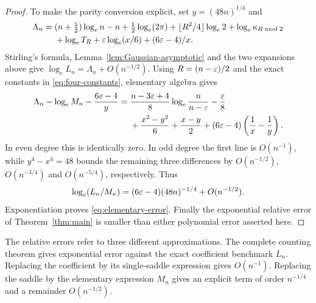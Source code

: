 \begin{proof}
To make the parity conversion explicit, set $y=(48n)^{1/4}$ and
\begin{align*}
 \Lambda_n={}&(n+\tfrac12)\log_en-n+\tfrac12\log_e(2\pi)
   +\lfloor R^2/4\rfloor\log_e2+\log_e\kappa_{R\bmod2}\\
 &+\log_eT_R+\varepsilon\log_e(x/6)+(6\varepsilon-4)/x.
\end{align*}
Stirling's formula, Lemma~\ref{lem:Gaussian-asymptotic} and the two
expansions above give $\log_e L_n=\Lambda_n+O(n^{-1/2})$.
Using $R=(n-\varepsilon)/2$ and the exact constants in
\eqref{eq:four-constants}, elementary algebra gives
\begin{align*}
 \Lambda_n-\log_eM_n-\frac{6\varepsilon-4}{y}
 ={}&\frac{n-3\varepsilon+4}{8}\log_e\frac{n}{n-\varepsilon}-\frac{\varepsilon}8\\
 &+\frac{x^2-y^2}{6}+\frac{x-y}{2}
       +(6\varepsilon-4)\left(\frac1x-\frac1y\right).
\end{align*}
In even degree this is identically zero. In odd degree the first line
is $O(n^{-1})$, while $y^4-x^4=48$ bounds the remaining three
differences by $O(n^{-1/2})$, $O(n^{-3/4})$ and $O(n^{-5/4})$,
respectively. Thus
\[
 \log_e(L_n/M_n)=(6\varepsilon-4)(48n)^{-1/4}+O(n^{-1/2}).
\]
Exponentiation proves \eqref{eq:elementary-error}. Finally the
exponential relative error of Theorem~\ref{thm:main}
is smaller than either polynomial error asserted here.
\end{proof}

\begin{remark}
The relative errors refer to three different approximations. The
complete counting theorem gives exponential error against the
exact coefficient benchmark $L_n$. Replacing the coefficient by its
single-saddle expression gives $O(n^{-1})$. Replacing the saddle by
the elementary expression $M_n$ gives an explicit term of order
$n^{-1/4}$ and a remainder $O(n^{-1/2})$.
\end{remark}
